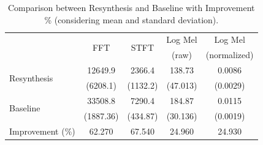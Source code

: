 \documentclass[10pt,conference]{IEEEtran}
\begin{document}
\begin{table}[htb] \small %
  \caption{Comparison between Resynthesis and Baseline with Improvement \% (considering mean and standard deviation).}
  \label{tab:metrics}
\begin{tabular*}{\columnwidth}
	{@{\extracolsep{\fill}}lcccc}
        \toprule
        & \multirow{2}{*}{FFT} & \multirow{2}{*}{STFT} & Log Mel & Log Mel \\ 
        & & & (raw) & (normalized) \\
        
        \midrule
        \multirow{2}{*}{Resynthesis} & 12649.9 & 2366.4 & 138.73 & 0.0086 \\
        & (6208.1) & (1132.2) & (47.013) & (0.0029) \\ 
        \multirow{2}{*}{Baseline} & 33508.8 & 7290.4 & 184.87 & 0.0115 \\
        & (1887.36) & (434.87) & (30.136) & (0.0019) \\
        \midrule
        Improvement (\%) & 62.270 & 67.540 & 24.960 & 24.930 \\
        \bottomrule
    \end{tabular*}
\end{table}


\end{document}
